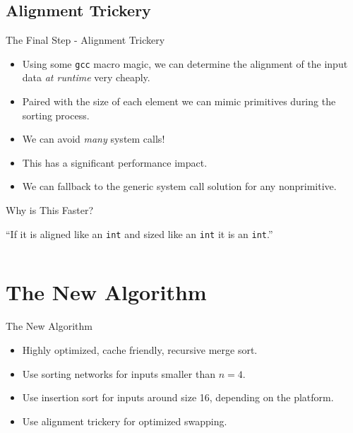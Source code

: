 \documentclass[13pt]{beamer}
\begin{document}
\subsection{Alignment Trickery}
\begin{frame}{The Final Step - Alignment Trickery}
	\begin{itemize}[<+->]
		\item Using some \texttt{gcc} macro magic, we can determine the alignment
		      of the input data \textit{at runtime} very cheaply.
		\item Paired with the size of each element we can mimic primitives during
		      the sorting process.
		\item We can avoid \textit{many} system calls!
		\item This has a significant performance impact.
		\item We can fallback to the generic system call solution for any
		      nonprimitive.
	\end{itemize}
\end{frame}

\begin{frame}{Why is This Faster?}
	\begin{displayquote}
		``If it is aligned like an \texttt{int} and sized like an \texttt{int}
		it is an \texttt{int}.''
	\end{displayquote}
	\begin{center}
		\begin{minipage}{0.7\textwidth}
			\inputminted[fontsize=\scriptsize]{c}{alignmenttricks.c}
		\end{minipage}
	\end{center}
\end{frame}

\section{The New Algorithm}
\begin{frame}{The New Algorithm}
	\pause
	\begin{itemize}[<+->]
		\item Highly optimized, cache friendly, recursive merge sort.
		\item Use sorting networks for inputs smaller than $n = 4$.
		\item Use insertion sort for inputs around size 16, depending on the
		      platform.
		\item Use alignment trickery for optimized swapping.
	\end{itemize}
\end{frame}
\end{document}
